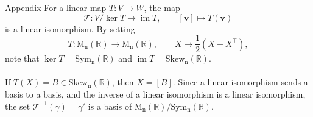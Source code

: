 \documentclass[handout]{beamer}
\def\image{\operatorname{im}}
\def\kernel{\operatorname{ker}}
\def\MnR{\operatorname{M_n(\mathbb{R})}}
\def\Sym{\operatorname{Sym_n(\mathbb{R})}}
\def\Skew{\operatorname{Skew_n(\mathbb{R})}}
\def\v{\bm{v}}
\begin{document}
        \begin{frame}[t]{Appendix}
                For a linear map $T \colon V \to W$, the map
                \[
                        \mathscr{T}\colon V/\kernel{T} \to \image{T}, \qquad [\v] \mapsto T(\v)
                \]
                is a linear isomorphism. By setting
                \[
                        T\colon \MnR \to \MnR, \qquad X \mapsto \frac{1}{2}(X - X^\top),
                \]
                note that $\kernel{T} = \Sym$ and $\image{T} = \Skew$. \\~\\

                If $T(X) = B \in \Skew$, then $X = [B]$. Since a linear isomorphism sends a basis to a basis, and the inverse of a linear isomorphism
                is a linear isomorphism, the set $\mathscr{T}^{-1}(\gamma) = \gamma'$ is a basis of $\MnR/\Sym$.
        \end{frame}
\end{document}

